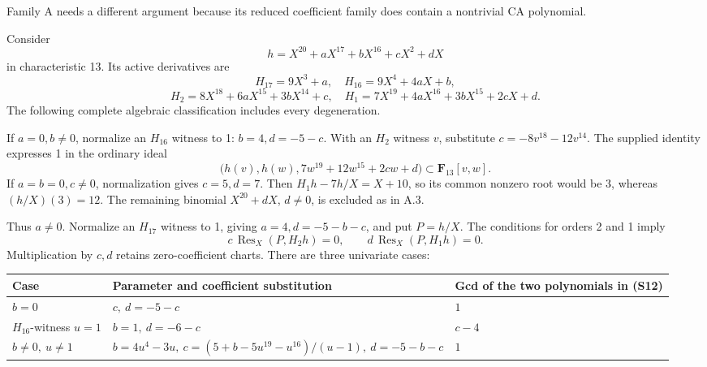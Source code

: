 \documentclass[
  british,
  10pt,
  a4paper,
]{article}
\newcounter{none} %
\begin{document}
Family A needs a different argument because its reduced coefficient
family does contain a nontrivial CA polynomial.

Consider \[
h=X^{20}+aX^{17}+bX^{16}+cX^2+dX
\] in characteristic 13. Its active derivatives are \[
H_{17}=9X^3+a,\quad H_{16}=9X^4+4aX+b,
\] \[
H_2=8X^{18}+6aX^{15}+3bX^{14}+c,\quad
H_1=7X^{19}+4aX^{16}+3bX^{15}+2cX+d.
\] The following complete algebraic classification includes every
degeneration.

If \(a=0,b\ne0\), normalize an \(H_{16}\) witness to 1: \(b=4,d=-5-c\).
With an \(H_2\) witness \(v\), substitute \(c=-8v^{18}-12v^{14}\). The
supplied identity expresses 1 in the ordinary ideal \[
\bigl(h(v),h(w),7w^{19}+12w^{15}+2cw+d\bigr)
\subset\mathbf F_{13}[v,w].
\tag{S11}
\] If \(a=b=0,c\ne0\), normalization gives \(c=5,d=7\). Then
\(H_1h-7h/X=X+10\), so its common nonzero root would be 3, whereas
\((h/X)(3)=12\). The remaining binomial \(X^{20}+dX\), \(d\ne0\), is
excluded as in A.3.

Thus \(a\ne0\). Normalize an \(H_{17}\) witness to 1, giving
\(a=4,d=-5-b-c\), and put \(P=h/X\). The conditions for orders 2 and 1
imply \[
c\,\operatorname{Res}_X(P,H_2h)=0,\qquad
d\,\operatorname{Res}_X(P,H_1h)=0.
\tag{S12}
\] Multiplication by \(c,d\) retains zero-coefficient charts. There are
three univariate cases:

{\def\LTcaptype{none} %
\begin{longtable}[]{@{}
  >{\raggedright\arraybackslash}p{}
  >{\raggedright\arraybackslash}p{}
  >{\raggedright\arraybackslash}p{}@{}}
\toprule\noalign{}
\begin{minipage}[b]{\linewidth}\raggedright
Case
\end{minipage} & \begin{minipage}[b]{\linewidth}\raggedright
Parameter and coefficient substitution
\end{minipage} & \begin{minipage}[b]{\linewidth}\raggedright
Gcd of the two polynomials in (S12)
\end{minipage} \\
\midrule\noalign{}
\endhead
\bottomrule\noalign{}
\endlastfoot
\(b=0\) & \(c,\ d=-5-c\) & \(1\) \\
\(H_{16}\)-witness \(u=1\) & \(b=1,\ d=-6-c\) & \(c-4\) \\
\(b\ne0,\ u\ne1\) &
\(b=4u^4-3u,\ c=(5+b-5u^{19}-u^{16})/(u-1),\ d=-5-b-c\) & \(1\) \\
\end{longtable}
}
\end{document}
